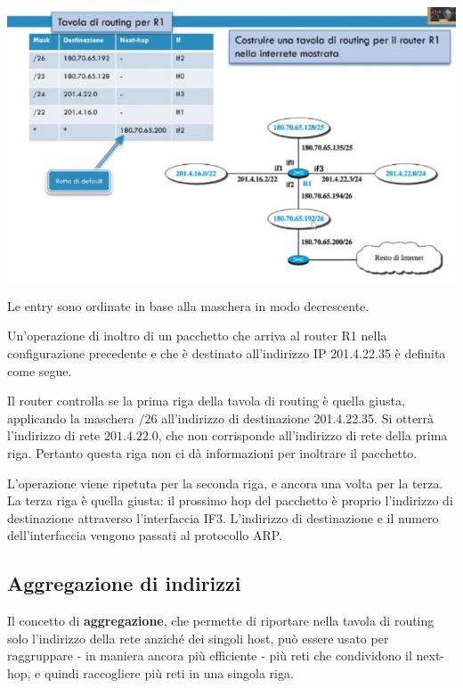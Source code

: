         \begin{center}
            \includegraphics[scale=0.5]{images/TavolaRoutingEsempio.png}
        \end{center}
        
        Le entry sono ordinate in base alla maschera in modo decrescente.
        
        \vspace{3mm}
        
        Un'operazione di inoltro di un pacchetto che arriva al router R1 nella configurazione precedente e che è destinato all'indirizzo IP 201.4.22.35 è definita come segue.
        
        Il router controlla se la prima riga della tavola di routing è quella giusta, applicando la maschera $/26$ all'indirizzo di destinazione 201.4.22.35. Si otterrà l'indirizzo di rete $201.4.22.0$, che non corrisponde all'indirizzo di rete della prima riga. Pertanto questa riga non ci dà informazioni per inoltrare il pacchetto.
        
        L'operazione viene ripetuta per la seconda riga, e ancora una volta per la terza. La terza riga è quella giusta: il prossimo hop del pacchetto è proprio l'indirizzo di destinazione attraverso l'interfaccia IF3. L'indirizzo di destinazione e il numero dell'interfaccia vengono passati al protocollo ARP.
        
    \subsection{Aggregazione di indirizzi}
    
        Il concetto di \textbf{aggregazione}, che permette di riportare nella tavola di routing solo l'indirizzo della rete anziché dei singoli host, può essere usato per raggruppare - in maniera ancora più efficiente - più reti che condividono il next-hop, e quindi raccogliere più reti in una singola riga.
        
